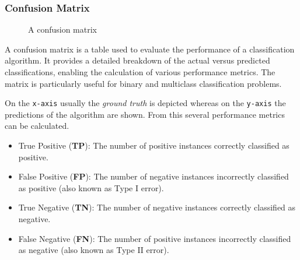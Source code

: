 \documentclass[
  a4paper,
]{scrbook}
\providecommand{\tightlist}{%
  \setlength{\itemsep}{0pt}\setlength{\parskip}{0pt}}\usepackage{longtable,booktabs,array}
\begin{document}
\subsubsection{Confusion Matrix}\label{confusion-matrix}

\begin{figure}[ht]


\caption{\label{fig-sngl-conmat}A confusion matrix}

\end{figure}%

A confusion matrix is a table used to evaluate the performance of a
classification algorithm. It provides a detailed breakdown of the actual
versus predicted classifications, enabling the calculation of various
performance metrics. The matrix is particularly useful for binary and
multiclass classification problems.

On the \texttt{x-axis} usually the \emph{ground truth} is depicted
whereas on the \texttt{y-axis} the predictions of the algorithm are
shown. From this several performance metrics can be calculated.

\begin{itemize}
\tightlist
\item
  True Positive (\textbf{TP}): The number of positive instances
  correctly classified as positive.
\item
  False Positive (\textbf{FP}): The number of negative instances
  incorrectly classified as positive (also known as Type I error).
\item
  True Negative (\textbf{TN}): The number of negative instances
  correctly classified as negative.
\item
  False Negative (\textbf{FN}): The number of positive instances
  incorrectly classified as negative (also known as Type II error).
\end{itemize}
\end{document}
